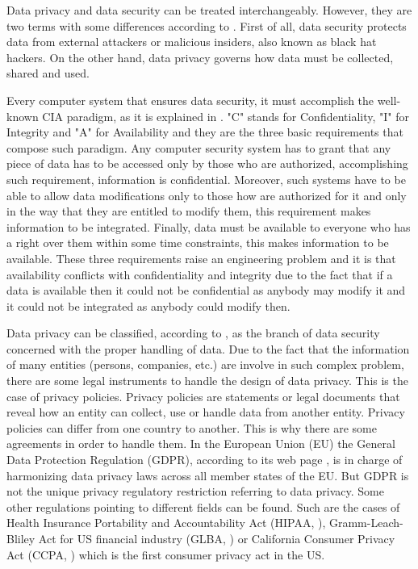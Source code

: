 Data privacy and data security can be treated interchangeably. However, they are two terms with some differences according to \cite{dataprivacy}. First of all, data security protects data from external attackers or malicious insiders, also known as black hat hackers. On the other hand, data privacy governs how data must be collected, shared and used.

Every computer system that ensures data security, it must accomplish the well-known CIA paradigm, as it is explained in \cite{computersecurityslides}. "C" stands for Confidentiality, "I" for Integrity and "A" for Availability and they are the three basic requirements that compose such paradigm. Any computer security system has to grant that any piece of data has to be accessed only by those who are authorized, accomplishing such requirement, information is confidential. Moreover, such systems have to be able to allow data modifications only to those how are authorized for it and only in the way that they are entitled to modify them, this requirement makes information to be integrated. Finally, data must be available to everyone who has a right over them within some time constraints, this makes information to be available. These three requirements raise an engineering problem and it is that availability conflicts with confidentiality and integrity due to the fact that if a data is available then it could not be confidential as anybody may modify it and it could not be integrated as anybody could modify then.

Data privacy can be classified, according to \cite{dataprivacy}, as the branch of data security concerned with the proper handling of data. Due to the fact that the information of many entities (persons, companies, etc.) are involve in such complex problem, there are some legal instruments to handle the design of data privacy. This is the case of privacy policies. Privacy policies are statements or legal documents that reveal how an entity can collect, use or handle data from another entity. Privacy policies can differ from one country to another. This is why there are some agreements in order to handle them. In the European Union (EU) the General Data Protection Regulation (GDPR), according to its web page \cite{gdprwebpage}, is in charge of harmonizing data privacy laws across all member states of the EU. But GDPR is not the unique privacy regulatory restriction referring to data privacy. Some other regulations pointing to different fields can be found. Such are the cases of Health Insurance Portability and Accountability Act (HIPAA, \cite{hipaablog}), Gramm-Leach-Bliley Act for US financial industry (GLBA, \cite{glbablog}) or California Consumer Privacy Act (CCPA, \cite{ccpablog}) which is the first consumer privacy act in the US.

